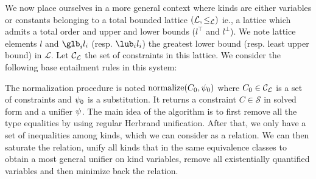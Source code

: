 We now place ourselves in a more general context where kinds are either variables
or constants belonging to a total bounded lattice $(\mathcal L, \leq_\mathcal L)$ ie.,
a lattice which admits a total order and upper and lower bounds ($l^\top$ and $l^\bot$).
We note lattice elements $l$ and $\glb_i l_i$ (resp. $\lub_i l_i$)
the greatest lower bound (resp. least upper bound) in $\mathcal L$.
%
Let ${\mathcal C_{\mathcal L}}$ the set of constraints in this lattice. We consider the
following base entailment rules in this system:
\begin{center}
\end{center}



The normalization procedure is noted $\operatorname{normalize}(C_0,\mathrm{\psi}_0)$ where
$C_0\in {\mathcal C_{\mathcal L}}$ is a set of constraints and $\mathrm{\psi}_0$ is a substitution.
It returns a constraint $C \in \mathcal S$ in
solved form and a unifier $\mathrm{\psi}$.
The main idea of the algorithm is to first remove all the type equalities
by using regular Herbrand unification. After that, we only have
a set of inequalities among kinds, which we can consider as a relation.
We can then saturate the relation,
unify all kinds that in the same equivalence classes to obtain
a most general unifier on kind variables,
remove all existentially quantified variables and
then minimize back the relation.

